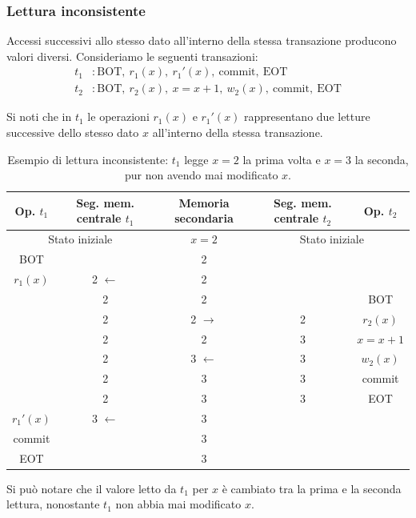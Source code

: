 \subsubsection{Lettura inconsistente}

Accessi successivi allo stesso dato all'interno della stessa transazione producono valori diversi. Consideriamo le seguenti transazioni:
\begin{align*}
	t_1 &: \text{BOT},\ r_1(x),\ r_1'(x),\ \text{commit},\ \text{EOT} \\
	t_2 &: \text{BOT},\ r_2(x),\ x = x+1,\ w_2(x),\ \text{commit},\ \text{EOT}
\end{align*}

Si noti che in $t_1$ le operazioni $r_1(x)$ e $r_1'(x)$ rappresentano due letture successive dello stesso dato $x$ all'interno della stessa transazione.

\begin{table}[H]
	\centering
	\begin{tabular}{|c|c|c|c|c|}
		\hline
		\textbf{Op. $t_1$} & \textbf{Seg. mem. centrale $t_1$} & \textbf{Memoria secondaria} & \textbf{Seg. mem. centrale $t_2$} & \textbf{Op. $t_2$} \\
		\hline
		\multicolumn{2}{|c|}{Stato iniziale} & $x = 2$ & \multicolumn{2}{c|}{Stato iniziale} \\
		\hline
		BOT & & 2 & & \\
		\hline
		$r_1(x)$ & 2 $\leftarrow$ & 2 & & \\
		\hline
		& 2 & 2 & & BOT \\
		\hline
		& 2 & 2 $\rightarrow$ & 2 & $r_2(x)$ \\
		\hline
		& 2 & 2 & 3 & $x = x+1$ \\
		\hline
		& 2 & 3 $\leftarrow$ & 3 & $w_2(x)$ \\
		\hline
		& 2 & 3 & 3 & commit \\
		\hline
		& 2 & 3 & 3 & EOT \\
		\hline
		\rowcolor{red!15}
		$r_1'(x)$ & 3 $\leftarrow$ & 3 & & \\
		\hline
		commit & & 3 & & \\
		\hline
		EOT & & 3 & & \\
		\hline
	\end{tabular}
	\caption{Esempio di lettura inconsistente: $t_1$ legge $x = 2$ la prima volta e $x = 3$ la seconda, pur non avendo mai modificato $x$.}
\end{table}

Si può notare che il valore letto da $t_1$ per $x$ è cambiato tra la prima e la seconda lettura, nonostante $t_1$ non abbia mai modificato $x$.
